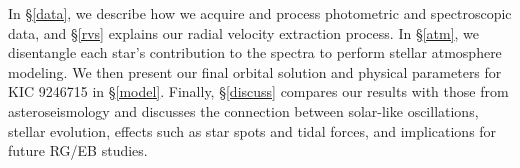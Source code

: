In \S \ref{data}, we describe how we acquire and process photometric and spectroscopic data, and \S \ref{rvs} explains our radial velocity extraction process. In \S \ref{atm}, we disentangle each star's contribution to the spectra to perform stellar atmosphere modeling. We then present our final orbital solution and physical parameters for KIC 9246715 in \S \ref{model}. Finally, \S \ref{discuss} compares our results with those from asteroseismology and discusses the connection between solar-like oscillations, stellar evolution, effects such as star spots and tidal forces, and implications for future RG/EB studies.
  
  
  
  
  
  